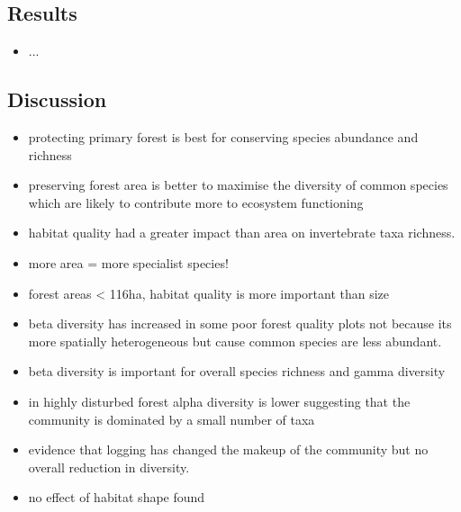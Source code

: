 \subsection*{Results}
\begin{itemize}
	\item ...
\end{itemize}

\subsection*{Discussion}
\begin{itemize}
	\item protecting primary forest is best for conserving species abundance and richness
	\item preserving forest area is better to maximise the diversity of common species which are likely to contribute more to ecosystem functioning
	\item habitat quality had a greater impact than area on invertebrate taxa richness.
	\item more area = more specialist species!
	\item forest areas < 116ha, habitat quality is more important than size  
	\item beta diversity has increased in some poor forest quality plots not because its more spatially heterogeneous but cause common species are less abundant.
	\item beta diversity is important for overall species richness and gamma diversity
	\item in highly disturbed forest alpha diversity is lower suggesting that the community is dominated by a small number of taxa
	\item evidence that logging has changed the makeup of the community but no overall reduction in diversity.
	\item no effect of habitat shape found
\end{itemize}